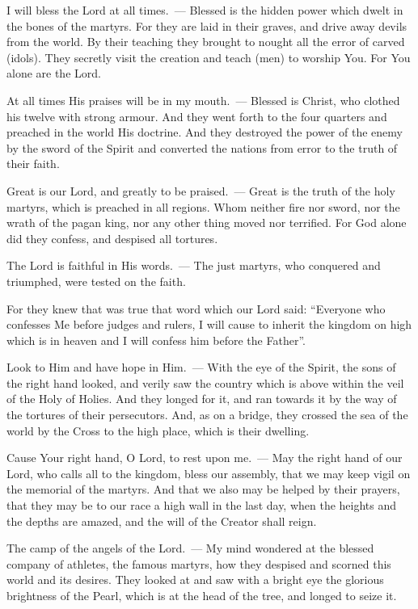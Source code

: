 \documentclass[12pt,twoside,a5paper]{article}
\begin{document}

\begin{halfparskip}
  I will bless the Lord at all times.~--- Blessed is the hidden power which dwelt in the bones of the martyrs. For they are laid in their graves, and drive away devils from the world. By their teaching they brought to nought all the error of carved (idols). They secretly visit the creation and teach (men) to worship You. For You alone are the Lord.

  At all times His praises will be in my mouth.~--- Blessed is Christ, who clothed his twelve with strong armour. And they went forth to the four quarters and preached in the world His doctrine. And they destroyed the power of the enemy by the sword of the Spirit and converted the nations from error to the truth of their faith.

  Great is our Lord, and greatly to be praised.~--- Great is the truth of the holy martyrs, which is preached in all regions. Whom neither fire nor sword, nor the wrath of the pagan king, nor any other thing moved nor terrified. For God alone did they confess, and despised all tortures.

  The Lord is faithful in His words.~--- The just martyrs, who conquered and triumphed, were tested on the faith.

  For they knew that was true that word which our Lord said: ``Everyone who confesses Me before judges and rulers, I will cause to inherit the kingdom on high which is in heaven and I will confess him before the Father''.

  Look to Him and have hope in Him.~--- With the eye of the Spirit, the sons of the right hand looked, and verily saw the country which is above within the veil of the Holy of Holies. And they longed for it, and ran towards it by the way of the tortures of their persecutors. And, as on a bridge, they crossed the sea of the world by the Cross to the high place, which is their dwelling.

  Cause Your right hand, O Lord, to rest upon me.~--- May the right hand of our Lord, who calls all to the kingdom, bless our assembly, that we may keep vigil on the memorial of the martyrs. And that we also may be helped by their prayers, that they may be to our race a high wall in the last day, when the heights and the depths are amazed, and the will of the Creator shall reign.

  The camp of the angels of the Lord.~--- My mind wondered at the blessed company of athletes, the famous martyrs, how they despised and scorned this world and its desires. They looked at and saw with a bright eye the glorious brightness of the Pearl, which is at the head of the tree, and longed to seize it.


\end{halfparskip}
\end{document}
